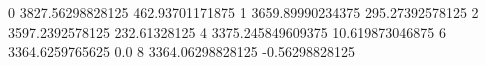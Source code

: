 0 3827.56298828125 462.93701171875
1 3659.89990234375 295.27392578125
2 3597.2392578125 232.61328125
4 3375.245849609375 10.619873046875
6 3364.6259765625 0.0
8 3364.06298828125 -0.56298828125
